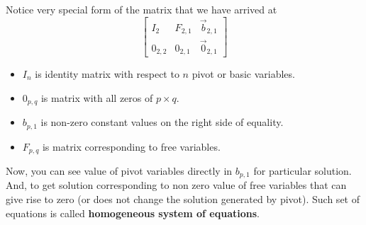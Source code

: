 \documentclass{article}
\begin{document}
Notice very special form of the matrix that we have arrived at\\
\[
\left[\begin{array}{c|c|c}
    I_2  &F_{2,1} &\vec{b}_{2,1}\\
    \hline 
    0_{2,2} &0_{2,1} &\vec{0}_{2,1}
  \end{array}\right]\]
\begin{itemize}
\item$I_n$ is identity matrix with respect to $n$ pivot or basic variables.
\item$0_{p,q}$ is matrix with all zeros of $p\times q$.
\item$b_{p,1}$ is non-zero constant values on the right side of equality.
\item$F_{p,q}$ is matrix corresponding to free variables.
\end{itemize}

Now, you can see value of pivot variables directly in $b_{p,1}$ for particular solution. And, to get solution corresponding to non zero value of free variables that can give rise to zero (or does not change the solution generated by pivot). Such set of equations is called \textbf{homogeneous system of equations}.
\end{document}

